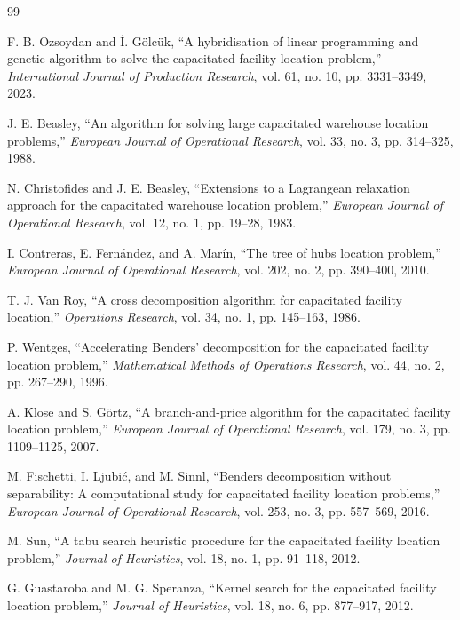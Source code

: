 \documentclass[conference]{IEEEtran}
\begin{document}

\begin{thebibliography}{99}

 F. B. Ozsoydan and İ. Gölcük, ``A hybridisation of linear programming and genetic algorithm to solve the capacitated facility location problem,'' \emph{International Journal of Production Research}, vol. 61, no. 10, pp. 3331--3349, 2023.

 J. E. Beasley, ``An algorithm for solving large capacitated warehouse location problems,'' \emph{European Journal of Operational Research}, vol. 33, no. 3, pp. 314--325, 1988.

 N. Christofides and J. E. Beasley, ``Extensions to a Lagrangean relaxation approach for the capacitated warehouse location problem,'' \emph{European Journal of Operational Research}, vol. 12, no. 1, pp. 19--28, 1983.

 I. Contreras, E. Fernández, and A. Marín, ``The tree of hubs location problem,'' \emph{European Journal of Operational Research}, vol. 202, no. 2, pp. 390--400, 2010.

 T. J. Van Roy, ``A cross decomposition algorithm for capacitated facility location,'' \emph{Operations Research}, vol. 34, no. 1, pp. 145--163, 1986.

 P. Wentges, ``Accelerating Benders' decomposition for the capacitated facility location problem,'' \emph{Mathematical Methods of Operations Research}, vol. 44, no. 2, pp. 267--290, 1996.

 A. Klose and S. Görtz, ``A branch-and-price algorithm for the capacitated facility location problem,'' \emph{European Journal of Operational Research}, vol. 179, no. 3, pp. 1109--1125, 2007.

 M. Fischetti, I. Ljubić, and M. Sinnl, ``Benders decomposition without separability: A computational study for capacitated facility location problems,'' \emph{European Journal of Operational Research}, vol. 253, no. 3, pp. 557--569, 2016.

 M. Sun, ``A tabu search heuristic procedure for the capacitated facility location problem,'' \emph{Journal of Heuristics}, vol. 18, no. 1, pp. 91--118, 2012.

 G. Guastaroba and M. G. Speranza, ``Kernel search for the capacitated facility location problem,'' \emph{Journal of Heuristics}, vol. 18, no. 6, pp. 877--917, 2012.


\end{thebibliography}
\end{document}
